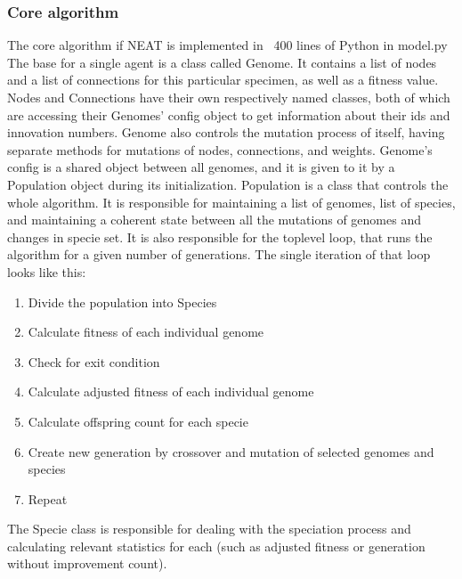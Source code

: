 \documentclass{article}
\begin{document}
        \subsubsection{Core algorithm}
        The core algorithm if NEAT is implemented in ~400 lines of Python in model.py
        The base for a single agent is a class called Genome. It contains a list of nodes and a list of connections for this particular 
        specimen, as well as a fitness value. Nodes and Connections have their own respectively named classes, both of which are accessing
        their Genomes' config object to get information about their ids and innovation numbers. Genome also controls the mutation process of itself,
        having separate methods for mutations of nodes, connections, and weights. Genome's config is a shared object between all genomes, and it is 
        given to it by a Population object during its initialization. Population is a class that controls the whole algorithm. It is responsible for
        maintaining a list of genomes, list of species, and maintaining a coherent state between all the mutations of genomes and changes in specie set.
        It is also responsible for the toplevel loop, that runs the algorithm for a given number of generations. The single iteration of that loop looks like this:
        \begin{enumerate}
            \item Divide the population into Species
            \item Calculate fitness of each individual genome
            \item Check for exit condition
            \item Calculate adjusted fitness of each individual genome
            \item Calculate offspring count for each specie
            \item Create new generation by crossover and mutation of selected genomes and species
            \item Repeat
        \end{enumerate}
        The Specie class is responsible for dealing with the speciation process and calculating relevant statistics for each (such as adjusted fitness or 
        generation without improvement count). 
\end{document}
